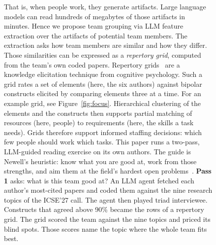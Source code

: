 \begin{figure}[p]
{\begin{minipage}[t]{\dimexpr0.62\textwidth-2\fboxsep-2\fboxrule}
That is, when people work, they generate artifacts.
Large language models can read hundreds of megabytes of those
artifacts in minutes.
Hence we propose team grouping via LLM feature extraction over
the artifacts of potential team members.
The extraction asks how team members are similar and how they
differ.
Those similarities can be expressed as a {\em repertory grid},
computed from the team's own coded papers.
Repertory grids~\cite{kelly55} are a knowledge elicitation
technique from cognitive psychology.
Such a grid rates a set of elements (here, the six authors)
against bipolar constructs elicited by comparing elements three
at a time.
For an example grid, see Figure~\ref{fig:focus}.
Hierarchical clustering of the elements and the constructs then
supports partial matching of resources (here, people) to
requirements (here, the skills a task needs).
Grids therefore support informed staffing decisions: which few
people should work which tasks.
This paper runs a two-pass, LLM-guided reading exercise on its
own authors.
The guide is Newell's heuristic: know what you are good at, work
from those strengths, and aim them at the field's hardest open
problems~\cite{newell91}.
{\bfseries Pass 1} asks: what is this team good at?
An LLM agent fetched each author's most-cited papers and coded
them against the nine research topics of the ICSE'27 call.
The agent then played triad interviewee.
Constructs that agreed above 90\% became the rows of a repertory
grid.
The grid scored the team against the nine topics and priced its
blind spots.
Those scores name the topic where the whole team fits best.



\end{minipage}}
\end{figure}
